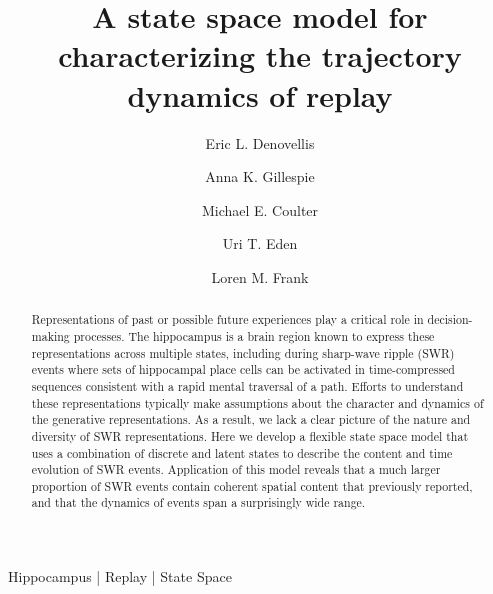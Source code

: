 \documentclass[times, twoside]{zHenriquesLab-StyleBioRxiv}
\begin{document}
\title{A state space model for characterizing the trajectory dynamics of replay}

\author[1]{Eric L. Denovellis}
\author[2, 3]{Anna K. Gillespie}
\author[2, 3]{Michael E. Coulter}
\author[4]{Uri T. Eden}
\author[1, 2, 3, \Letter]{Loren M. Frank}



\maketitle

\begin{abstract}
Representations of past or possible future experiences play a critical role in decision-making processes. The hippocampus is a brain region known to express these representations across multiple states, including during sharp-wave ripple (SWR) events where sets of hippocampal place cells can be activated in time-compressed sequences consistent with a rapid mental traversal of a path. Efforts to understand these representations typically make assumptions about the character and dynamics of the generative representations. As a result, we lack a clear picture of the nature and diversity of SWR representations. Here we develop a flexible state space model that uses a combination of discrete and latent states to describe the content and time evolution of SWR events. Application of this model reveals that a much larger proportion of SWR events contain coherent spatial content that previously reported, and that the dynamics of events span a surprisingly wide range. 

\end {abstract}

\begin{keywords}
Hippocampus | Replay | State Space
\end{keywords}
\end{document}
